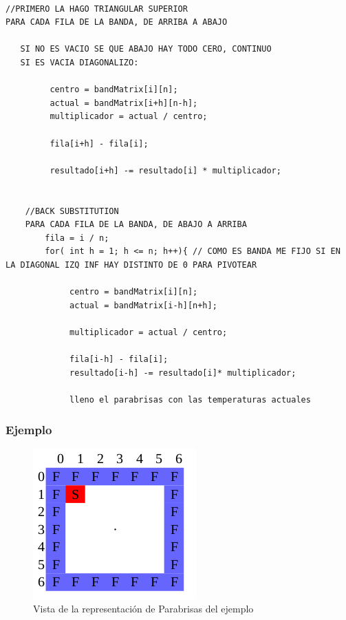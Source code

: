 \begin{verbatim}

//PRIMERO LA HAGO TRIANGULAR SUPERIOR
PARA CADA FILA DE LA BANDA, DE ARRIBA A ABAJO
		
   SI NO ES VACIO SE QUE ABAJO HAY TODO CERO, CONTINUO
   SI ES VACIA DIAGONALIZO:
        
         centro = bandMatrix[i][n];
         actual = bandMatrix[i+h][n-h];
         multiplicador = actual / centro;
		
         fila[i+h] - fila[i];

         resultado[i+h] -= resultado[i] * multiplicador;
   

    //BACK SUBSTITUTION
    PARA CADA FILA DE LA BANDA, DE ABAJO A ARRIBA
        fila = i / n;
        for( int h = 1; h <= n; h++){ // COMO ES BANDA ME FIJO SI EN LA DIAGONAL IZQ INF HAY DISTINTO DE 0 PARA PIVOTEAR
           
             centro = bandMatrix[i][n];
             actual = bandMatrix[i-h][n+h];
           
             multiplicador = actual / centro;
		
             fila[i-h] - fila[i];
             resultado[i-h] -= resultado[i]* multiplicador;
                
             lleno el parabrisas con las temperaturas actuales
\end{verbatim}


\subsubsection{Ejemplo}
\begin{figure}[htb]
\begin{center}
\includegraphics[scale=0.70]{imagenes/parabrisasej.png} 
\caption{Vista de la representación de Parabrisas del ejemplo} 
\end{center}
\end{figure}

